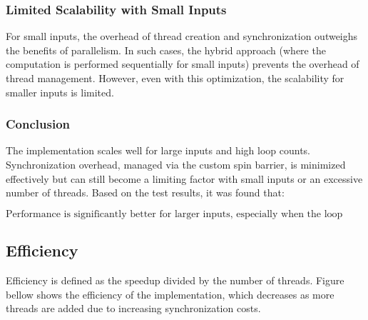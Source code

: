 \documentclass[letterpaper,12pt]{article}
\theoremstyle{remark}
\begin{document}
\subsubsection{Limited Scalability with Small Inputs}
For small inputs, the overhead of thread creation and synchronization outweighs the benefits of parallelism. In such cases, the hybrid approach (where the computation is performed sequentially for small inputs) prevents the overhead of thread management. However, even with this optimization, the scalability for smaller inputs is limited.

\subsubsection*{Conclusion}
The implementation scales well for large inputs and high loop counts. Synchronization overhead, managed via the custom spin barrier, is minimized effectively but can still become a limiting factor with small inputs or an excessive number of threads. Based on the test results, it was found that:

\[
\text{Performance is significantly better for larger inputs, especially when the loop count is increased.}
\]

\subsection{Efficiency}
Efficiency is defined as the speedup divided by the number of threads. 
Figure bellow shows the efficiency of the implementation, which decreases as more threads are added due to increasing synchronization costs.
\end{document}

